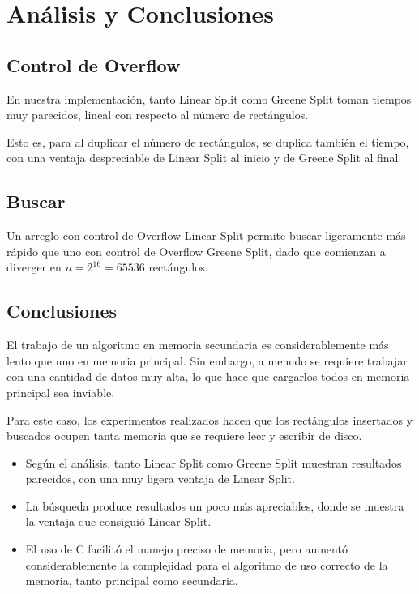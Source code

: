 \documentclass[letterpaper,10pt]{article}
\begin{document}
	\newpage

	\section{Análisis y Conclusiones}

	\subsection{Control de Overflow}

	En nuestra implementación, tanto Linear Split como Greene Split toman tiempos muy parecidos, lineal con respecto al número de rectángulos.

	Esto es, para al duplicar el número de rectángulos, se duplica también el tiempo, con una ventaja despreciable de Linear Split al inicio y de Greene Split al final.

	\subsection{Buscar}

	Un arreglo con control de Overflow Linear Split permite buscar ligeramente más rápido que uno con control de Overflow Greene Split, dado que comienzan a diverger en
	$n = 2^{16} = 65536$ rectángulos.

	\subsection{Conclusiones}

	El trabajo de un algoritmo en memoria secundaria es considerablemente más lento que uno en memoria principal. Sin embargo, a menudo se requiere trabajar con una cantidad de datos
	muy alta, lo que hace que cargarlos todos en memoria principal sea inviable.

	Para este caso, los experimentos realizados hacen que los rectángulos insertados y buscados ocupen tanta memoria que se requiere leer y escribir de disco.

	\begin{itemize}
		\item Según el análisis, tanto Linear Split como Greene Split muestran resultados parecidos, con una muy ligera ventaja de Linear Split.
		\item La búsqueda produce resultados un poco más apreciables, donde se muestra la ventaja que consiguió Linear Split.
		\item El uso de C facilitó el manejo preciso de memoria, pero aumentó considerablemente la complejidad para el algoritmo de uso correcto de la memoria, tanto
		principal como secundaria.
	\end{itemize}
\end{document}
